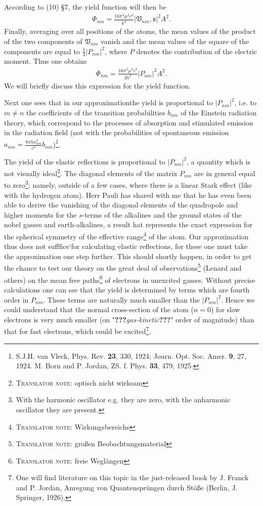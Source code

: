 \documentclass[a4paper,11pt]{article}
\newcommand{\textbb}[1]{\textbf{#1}}
\newcommand{\WTF}[1]{\textbf{???}\textit{#1}\textbf{???}}
\newcommand{\?}[2]{#1\footnote{\textsc{Translator note}: #2}}
\newcommand{\nequ}[2]{\begin{align*}\tag{#1}#2\end{align*}}
\begin{document}
According to (10) \S7, the yield function will then be
\nequ{6}{
\Phi_{nm} = \frac{16\pi^2\mu^2 c^2}{k^4}\left|\mathfrak{V}_{nm},\mathfrak{s}\right|^2A^2.
}
Finally, averaging over all positions of the atoms, the mean values of the product of the two components of $\mathfrak{V}_{nm}$ vanish and the mean values of the square of the components are equal to $\frac{1}{3}\left|P_{nm}\right|^2$, where $P$ denotes the contribution of the electric moment. Thus one obtains
\nequ{7}{
\Phi_{nm} = \frac{16\pi^2 \mu^2 c^2}{3h^2}\left|P_{nm}\right|^2 A^2.
}
We will briefly discuss this expression for the yield function.

Next one sees that in our approximationthe yield is proportional to $\left|P_{nm}\right|^2$, i.e. to $m\neq n$ the coefficients of the transition probabilities $b_{nm}$ of the Einstein radiation theory, which correspond to the processes of absorption and stimulated emission in the radiation field (not with the probabilities of spontaneous emission $a_{nm} = \frac{8\pi h\nu_{nm}^3}{c^3} b_{nm}$)\footnote{S.J.H. van Vleck, Phys. Rev. \textbf{23}, 330, 1924; Journ. Opt. Soc. Amer. \textbb{9}, 27, 1924. M. Born and P. Jordan, ZS. f. Phys. \textbf{33}, 479, 1925.}.

The yield of the elastic reflections is proportional to $|P_{nm}|^2$, a quantity which is \?{not visually ideal}{optisch nicht wirksam}. The diagonal elements of the matrix $P_{nm}$ are in general equal to zero\footnote{With the harmonic oscillator e.g. they are zero, with the anharmonic oscillator they are present.}; namely, outside of a few cases, where there is a linear Stark effect (like with the hydrogen atom). Herr Pauli has shared with me that he has even been able to derive the vanishing of the diagonal elements of the quadropole and higher moments for the $s$-terms of the alkalines and the ground states of the nobel gasses and earth-alkalines, a result hat represents the exact expression for the spherical symmetry of the \?{effective range}{Wirkungsbereichs} of the atom. Our approximation thus does not sufffice`for calculating elastic reflections, for these one must take the approximation one step further.  This should shortly happen, in order to get the chance to test our theory on the \?{great deal of observations}{gro{\ss}en Beobachtungsmaterial} (Lenard and others) on the \?{mean free paths}{freie Wegl\"angen} of electrons in unexcited gasses. Without precise calculations one can see that the yield is determined by terms which are fourth order in $P_{nm}$. These terms are naturally much smaller than the $\left|P_{nm}\right|^2$. Hence we could understand that the normal cross-section of the atom ($n=0$) for slow electrons is very much smaller (on "\WTF{gas-kinetic}" order of magnitude) than that for fast electrons, which could be excited\footnote{One will find literature on this topic in the just-released book by J. Franck and P. Jordan, Anregung von Quantenspr\"ungen durch St\"o{\ss}e (Berlin, J. Springer, 1926).}.
\end{document}

